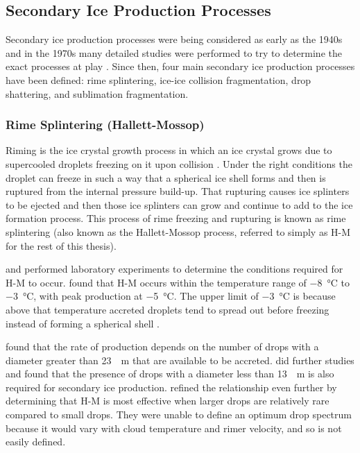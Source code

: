 \subsection{Secondary Ice Production Processes}
Secondary ice production processes were being considered as early as the 1940s \citep{brew1949} and in the 1970s many detailed studies were performed to try to determine the exact processes at play \citep[e.g.][]{hal1974, moss1974, moss1978, vard1978}. Since then, four main secondary ice production processes have been defined: rime splintering, ice-ice collision fragmentation, drop shattering, and sublimation fragmentation.

\subsubsection{Rime Splintering (Hallett-Mossop)}
Riming is the ice crystal growth process in which an ice crystal grows due to supercooled droplets freezing on it upon collision \citep{lamb2011}. Under the right conditions the droplet can freeze in such a way that a spherical ice shell forms and then is ruptured from the internal pressure build-up. That rupturing causes ice splinters to be ejected and then those ice splinters can grow and continue to add to the ice formation process. \citep{field2017} This process of rime freezing and rupturing is known as rime splintering (also known as the Hallett-Mossop process, referred to simply as H-M for the rest of this thesis).

\cite{hal1974} and \cite{moss1974} performed laboratory experiments to determine the conditions required for H-M to occur. \cite{hal1974} found that H-M occurs within the temperature range of \SI{-8}{\degreeCelsius} to \SI{-3}{\degreeCelsius}, with peak production at \SI{-5}{\degreeCelsius}. The upper limit of \SI{-3}{\degreeCelsius} is because above that temperature accreted droplets tend to spread out before freezing instead of forming a spherical shell \citep{mack1967, choul1980, grig1983, dong1989, mason1996}.

\cite{moss1974} found that the rate of production depends on the number of drops with a diameter greater than \SI{23}{\mu m} that are available to be accreted. \cite{moss1978} did further studies and found that the presence of drops with a diameter less than \SI{13}{\mu m} is also required for secondary ice production. \cite{moss1985} refined the relationship even further by determining that H-M is most effective when larger drops are relatively rare compared to small drops. They were unable to define an optimum drop spectrum because it would vary with cloud temperature and rimer velocity, and so is not easily defined.

